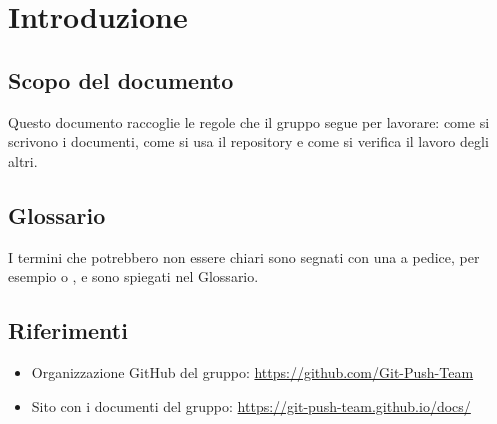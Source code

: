 
\section{Introduzione}

\subsection{Scopo del documento}
Questo documento raccoglie le regole che il gruppo segue per lavorare:
come si scrivono i documenti, come si usa il repository e come si
verifica il lavoro degli altri.

\subsection{Glossario}
I termini che potrebbero non essere chiari sono segnati con una
 a pedice, per esempio  o ,
e sono spiegati nel Glossario.

\subsection{Riferimenti}
\begin{itemize}
  \item Organizzazione GitHub del gruppo:
        \url{https://github.com/Git-Push-Team}
  \item Sito con i documenti del gruppo:
        \url{https://git-push-team.github.io/docs/}
\end{itemize}
